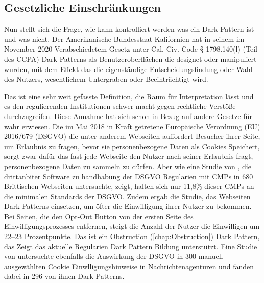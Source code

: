 \documentclass[conference,compsoc,final,a4paper]{IEEEtran}
\begin{document}



\subsection{Gesetzliche Einschränkungen}


Nun stellt sich die Frage, wie kann kontrolliert werden was ein Dark Pattern ist und was nicht. Der Amerikanische Bundesstaat Kalifornien hat in seinem im November 2020 Verabschiedetem Gesetz unter Cal. Civ. Code § 1798.140(l) (Teil des \ac{CCPA}) Dark Patterns als Benutzeroberflächen die designet oder manipuliert wurden, mit dem Effekt das die eigenständige Entscheidungsfindung oder Wahl des Nutzers, wesentlichem Untergraben oder Beeinträchtigt wird.

Das ist eine sehr weit gefasste Definition, die Raum für Interpretation lässt und es den regulierenden Institutionen schwer macht gegen rechtliche Verstöße durchzugreifen. Diese Annahme hat sich schon in Bezug auf andere Gesetze für wahr erwiesen. Die im Mai 2018 in Kraft getretene Europäische Verordnung (EU) 2016/679 (\ac{DSGVO}) die unter anderem Webseiten auffordert Besucher ihrer Seite, um Erlaubnis zu fragen, bevor sie personenbezogene Daten als Cookies Speichert, sorgt zwar dafür das fast jede Webseite den Nutzer nach seiner Erlaubnis fragt, personenbezogene Daten zu sammeln zu dürfen. Aber wie eine Studie von \citeauthor{Nouwens2020} \autocite{Nouwens2020}, die drittanbiter Software zu handhabung der \acs{DSGVO} Regularien mit \acp{CMP} in 680 Brittischen Webseiten untersuchte, zeigt, halten sich nur 11,8\% dieser \acsp{CMP} an die minimalen Standards der \acs{DSGVO}. Zudem ergab die Studie, das Webseiten Dark Patterns einsetzen, um öfter die Einwilligung ihrer Nutzer zu bekommen. Bei Seiten, die den Opt-Out Button von der ersten Seite des Einwilligungsprozesses entfernen, steigt die Anzahl der Nutzer die Einwilligen um 22–23 Prozentpunkte. Das ist ein Obstruction (\autoref{chap:Obstruction}) Dark Pattern, das Zeigt das aktuelle Regularien Dark Pattern Bildung unterstützt. Eine Studie von \citeauthor{Soe2020} untersuchte ebenfalls die Auswirkung der  \acs{DSGVO} in 300 manuell ausgewählten Cookie Einwlligungshinweise in Nachrichtenagenturen und fanden dabei in 296 von ihnen Dark Patterns.
\end{document}
